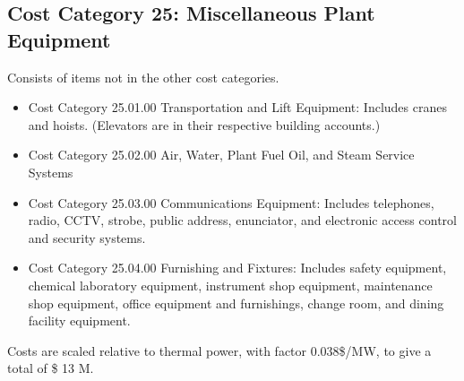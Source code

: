 \subsection{Cost Category 25: Miscellaneous Plant Equipment}  %

Consists of items not in the other cost categories.

\begin{itemize}

\item Cost Category 25.01.00 Transportation and Lift Equipment: Includes cranes and hoists. (Elevators are in their respective building accounts.)

\item  Cost Category 25.02.00 Air, Water, Plant Fuel Oil, and Steam Service Systems

\item  Cost Category 25.03.00 Communications Equipment: Includes telephones, radio, CCTV, strobe, public address, enunciator, and electronic access control and security systems.

\item  Cost Category 25.04.00 Furnishing and Fixtures: Includes safety equipment, chemical laboratory equipment, instrument shop equipment, maintenance shop equipment, office equipment and furnishings, change room, and dining facility equipment.

\end{itemize}

Costs are scaled relative to thermal power, with factor 0.038\$/MW, to give a total of \$ 13 M. 
